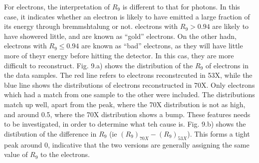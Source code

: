 \documentclass[10pt]{article}
\begin{document}
For electrons, the interpretation of $R_9$ is different to that for photons. In this case, it indicates whether an electron is likely to have emitted a large fraction of its energy through bremmshtalung or not. electrons with $R_9>0.94$ are likely to have showered little, and are known as ``gold'' electrons. On the other hadn, electrons with $R_9\leq 0.94$ are known as ``bad'' electrons, as they will have little more of theyr energy before hitting the detector. In this cas, they are more difficult to reconstruct. Fig. 9.a) shows the distribution of the $R_9$ of electrons in the data samples. The red line refers to electrons reconstrcuted in 53X, while the blue line shows the distributions of electrons reconstructed in 70X. Only electrons which had a match from one sample to the other were included. The distributions match up well, apart from the peak, where the 70X distribution is not as high, and around 0.5, where the 70X distribution shows a bump. These features needs to be investigated, in order to determine what teh cause is. Fig. 9.b) shows the distibution of the difference in $R_9$ (ie $(R_9)_{70X} -(R_9)_{53X}$). This forms a tight peak around 0, indicative that the two versions are generally assigning the same value of $R_9$ to the electrons.
\end{document}

